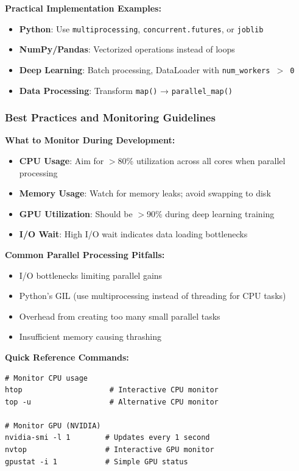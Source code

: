 \documentclass[11pt,a4paper]{article}
\newcommand{\warningitem}{\item[\color{orange}\faExclamationTriangle]}
\begin{document}
\textbf{Practical Implementation Examples:}
\begin{itemize}
    \item \textbf{Python}: Use \texttt{multiprocessing}, \texttt{concurrent.futures}, or \texttt{joblib}
    \item \textbf{NumPy/Pandas}: Vectorized operations instead of loops
    \item \textbf{Deep Learning}: Batch processing, DataLoader with \texttt{num\_workers $>$ 0}
    \item \textbf{Data Processing}: Transform \texttt{map()} → \texttt{parallel\_map()}
\end{itemize}

\subsubsection{Best Practices and Monitoring Guidelines}

\textbf{What to Monitor During Development:}
\begin{itemize}
    \item \textbf{CPU Usage}: Aim for $>$80\% utilization across all cores when parallel processing
    \item \textbf{Memory Usage}: Watch for memory leaks; avoid swapping to disk
    \item \textbf{GPU Utilization}: Should be $>$90\% during deep learning training
    \item \textbf{I/O Wait}: High I/O wait indicates data loading bottlenecks
\end{itemize}

\textbf{Common Parallel Processing Pitfalls:}
\begin{itemize}
    \warningitem I/O bottlenecks limiting parallel gains
    \warningitem Python's GIL (use multiprocessing instead of threading for CPU tasks)
    \warningitem Overhead from creating too many small parallel tasks
    \warningitem Insufficient memory causing thrashing
\end{itemize}

\textbf{Quick Reference Commands:}

\begin{lstlisting}[style=bashstyle, caption=System Monitoring Commands]
# Monitor CPU usage
htop                    # Interactive CPU monitor
top -u                  # Alternative CPU monitor

# Monitor GPU (NVIDIA)
nvidia-smi -l 1        # Updates every 1 second
nvtop                  # Interactive GPU monitor
gpustat -i 1           # Simple GPU status
\end{lstlisting}
\end{document}
